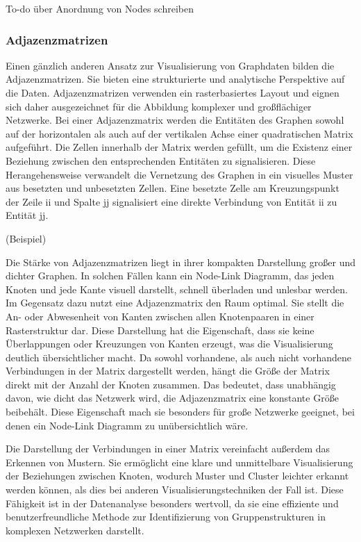 To-do über Anordnung von Nodes schreiben

\subsubsection{Adjazenzmatrizen}

Einen gänzlich anderen Ansatz zur Visualisierung von Graphdaten bilden die Adjazenzmatrizen. Sie bieten eine strukturierte und analytische Perspektive auf die Daten. Adjazenzmatrizen verwenden ein rasterbasiertes Layout und eignen sich daher ausgezeichnet für die Abbildung komplexer und großflächiger Netzwerke. Bei einer Adjazenzmatrix werden die Entitäten des Graphen sowohl auf der horizontalen als auch auf der vertikalen Achse einer quadratischen Matrix aufgeführt. Die Zellen innerhalb der Matrix werden gefüllt, um die Existenz einer Beziehung zwischen den entsprechenden Entitäten zu signalisieren. Diese Herangehensweise verwandelt die Vernetzung des Graphen in ein visuelles Muster aus besetzten und unbesetzten Zellen. Eine besetzte Zelle am Kreuzungspunkt der Zeile ii und Spalte jj signalisiert eine direkte Verbindung von Entität ii zu Entität jj.

(Beispiel)

Die Stärke von Adjazenzmatrizen liegt in ihrer kompakten Darstellung großer und dichter Graphen. In solchen Fällen kann ein Node-Link Diagramm, das jeden Knoten und jede Kante visuell darstellt, schnell überladen und unlesbar werden. Im Gegensatz dazu nutzt eine Adjazenzmatrix den Raum optimal. Sie stellt die An- oder Abwesenheit von Kanten zwischen allen Knotenpaaren in einer Rasterstruktur dar. Diese Darstellung hat die Eigenschaft, dass sie keine Überlappungen oder Kreuzungen von Kanten erzeugt, was die Visualisierung deutlich übersichtlicher macht. Da sowohl vorhandene, als auch nicht vorhandene Verbindungen in der Matrix dargestellt werden, hängt die Größe der Matrix direkt mit der Anzahl der Knoten zusammen. Das bedeutet, dass unabhängig davon, wie dicht das Netzwerk wird, die Adjazenzmatrix eine konstante Größe beibehält. Diese Eigenschaft mach sie besonders für große Netzwerke geeignet, bei denen ein Node-Link Diagramm zu unübersichtlich wäre. 

Die Darstellung der Verbindungen in einer Matrix vereinfacht außerdem das Erkennen von Mustern. Sie ermöglicht eine klare und unmittelbare Visualisierung der Beziehungen zwischen Knoten, wodurch Muster und Cluster leichter erkannt werden können, als dies bei anderen Visualisierungstechniken der Fall ist. Diese Fähigkeit ist in der Datenanalyse besonders wertvoll, da sie eine effiziente und benutzerfreundliche Methode zur Identifizierung von Gruppenstrukturen in komplexen Netzwerken darstellt.

